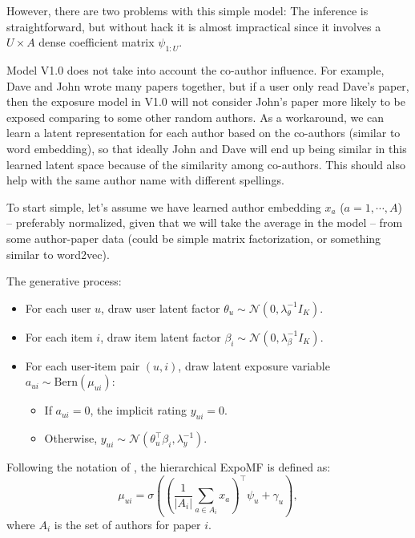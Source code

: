 However, there are two problems with this simple model: The inference is straightforward, but without hack it is almost impractical since it involves a $U\times A$ dense coefficient matrix $\psi_{1:U}$.


Model V1.0 does not take into account the co-author influence. For example, Dave and John wrote many papers together, but if a user only read Dave's paper, then the exposure model in V1.0 will not consider John's paper more likely to be exposed comparing to some other random authors. As a workaround, we can learn a latent representation for each author based on the co-authors (similar to word embedding), so that ideally John and Dave will end up being similar in this learned latent space because of the similarity among co-authors. This should also help with the same author name with different spellings.

To start simple, let's assume we have learned author embedding $x_a$ ($a = 1,\cdots, A$) -- preferably normalized, given that we will take the average in the model -- from some author-paper data (could be simple matrix factorization, or something similar to word2vec). 

The generative process:
\begin{itemize}
\item For each user $u$, draw user latent factor $\theta_{u} \sim \mathcal{N}(0, \lambda_\theta^{-1} I_K)$.
\item For each item $i$, draw item latent factor $\beta_{i} \sim \mathcal{N}(0, \lambda_\beta^{-1} I_K)$.
\item For each user-item pair $(u, i)$, draw latent exposure variable $a_{ui} \sim \text{Bern}(\mu_{ui})$:
\begin{itemize}
\item If $a_{ui} = 0$, the implicit rating $y_{ui} = 0$.
\item Otherwise, $y_{ui} \sim \mathcal{N}(\theta_u^\top\beta_i, \lambda_y^{-1})$.
\end{itemize}
\end{itemize}

Following the notation of , the hierarchical ExpoMF is defined as:
\[\mu_{ui} = \sigma((\frac{1}{|A_i|}\sum_{a\in A_i} x_a)^\top \psi_u + \gamma_u),\]
where $A_i$ is the set of authors for paper $i$. 


